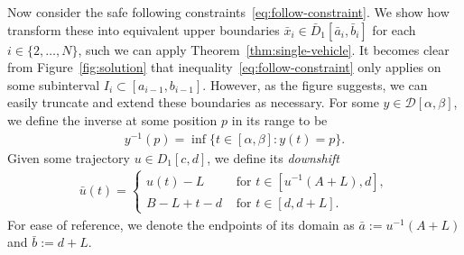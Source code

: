 \documentclass{report}
\theoremstyle{definition}
\theoremstyle{plain}
\begin{document}
Now consider the safe following constraints~\eqref{eq:follow-constraint}.
%
We show how transform these into equivalent upper boundaries
$\bar{x}_{i} \in \bar{D}_{1}[\bar{a}_{i}, \bar{b}_{i}]$ for each
$i \in \{2, \dots, N\}$, such we can apply Theorem~\ref{thm:single-vehicle}.
%
It becomes clear from Figure~\ref{fig:solution} that
inequality~\eqref{eq:follow-constraint} only applies on some subinterval
$I_{i} \subset [a_{i-1}, b_{i-1}]$.
%
However, as the figure suggests, we can easily truncate and extend these
boundaries as necessary.
%
For some $y \in \mathcal{D}[\alpha, \beta]$, we define the inverse at some
position $p$ in its range to be
\begin{align}
  y^{-1}(p) = \inf \{ t \in [\alpha, \beta] : y(t) = p\} .
\end{align}
%
Given some trajectory $u \in D_{1}[c,d]$, we define its \emph{downshift}
%
\begin{align}
  \bar{u}(t) =
  \begin{cases}
    u(t) - L &\text{ for } t \in [u^{-1}(A + L), d] , \\
    B - L + t - d &\text{ for } t \in [d, d + L] .
  \end{cases}
\end{align}
For ease of reference, we denote the endpoints of its domain as
$\bar{a} := u^{-1}(A+L)$ and $\bar{b} := d + L$.
\end{document}
